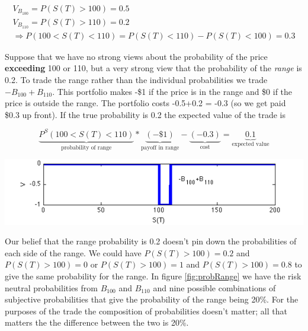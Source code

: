 \begin{eqnarray*}
V_{B_{100}} = P(S(T)>100) =0.5\\
V_{B_{110}} = P(S(T)>110) = 0.2\\
\Rightarrow P(100<S(T)<110) = P(S(T)<110) - P(S(T)<100) = 0.3 
\end{eqnarray*}

Suppose that we have no strong views about the probability of the price \textbf{exceeding} 100 or 110, but a very strong view that the probability of the \textit{range} is 0.2. To trade the range rather than the individual probabilities we trade $-B_{100}+B_{110}$. This portfolio makes -\$1 if the price is in the range and \$0 if the price is outside the range. The portfolio costs -0.5+0.2 = -0.3 (so we get paid \$0.3 up front).  If the true probability is 0.2 the expected value of the trade is 

\[\underbrace{P^S(100<S(T)<110)}_{\mbox{probability of range}}*\underbrace{(-\$1)}_{\mbox{payoff in range}}- \underbrace{(-0.3)}_{\mbox{cost}} = \underbrace{0.1}_{\mbox{expected value}} \]

 \begin{center}
\includegraphics[width=6in]{pics/soldBinary}%
\label{fig: soldBinary}%
\end{center}


Our belief that the range probability is 0.2 doesn't pin down the probabilities of each side of the range. We could have $P(S(T)>100) = 0.2$ and $P(S(T)>100) = 0$ or $P(S(T)>100) = 1$ and $P(S(T)>100) = 0.8$ to give the same probability for the range. In figure \ref{fig:probRange} we have the risk neutral probabilities from $B_{100}$ and $B_{110}$ and nine possible combinations of subjective probabilities that give the probability of the range being 20\%. For the purposes of the trade the composition of probabilities doesn't matter; all that matters the the difference between the two is 20\%.  


